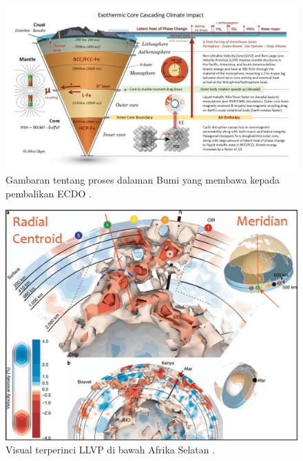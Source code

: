 \documentclass[10pt,twocolumn,letterpaper]{article}
\begin{document}
\begin{figure}[t]
\begin{center}
\includegraphics[width=1\textwidth]{layers.jpg}
\end{center}
   \caption{Gambaran tentang proses dalaman Bumi yang membawa kepada pembalikan ECDO \cite{129}.}
\label{fig:11}
\end{figure}


\begin{figure}[t]
\begin{center}
   \includegraphics[width=1\linewidth]{llvp.jpg}
\end{center}
   \caption{Visual terperinci LLVP di bawah Afrika Selatan \cite{28}.}
\label{fig:12}
\label{fig:onecol}
\end{figure}
\end{document}
